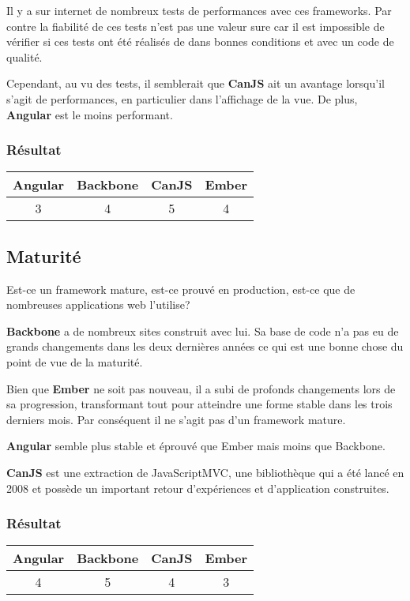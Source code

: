 Il y a sur internet de nombreux tests de performances avec ces frameworks. Par contre la fiabilité de ces tests n'est pas une valeur sure car il est impossible de vérifier si ces tests ont été réalisés de dans bonnes conditions et avec un code de qualité.

Cependant, au vu des tests, il semblerait que \textbf{CanJS} ait un avantage lorsqu'il s’agit de performances, en particulier dans l’affichage de la vue. De plus, \textbf{Angular} est le moins performant.

\subsubsection{Résultat}
\begin{tabular}{|c|c|c|c|}
  \hline 
  Angular & Backbone & CanJS & Ember \\
  \hline 
  3 & 4 & 5 & 4 \\
  \hline
\end{tabular}


\subsection{Maturité}

Est-ce un framework mature, est-ce prouvé en production, est-ce que de nombreuses applications web l’utilise?

\textbf{Backbone} a de nombreux sites construit avec lui. Sa base de code n’a pas eu de grands changements dans les deux dernières années ce qui est une bonne chose du point de vue de la maturité.

Bien que \textbf{Ember} ne soit pas nouveau, il a subi de profonds changements lors de sa progression, transformant tout pour atteindre une forme stable dans les trois derniers mois. Par conséquent il ne s’agit pas d’un framework mature.

\textbf{Angular} semble plus stable et éprouvé que Ember mais moins que Backbone.

\textbf{CanJS} est une extraction de JavaScriptMVC, une bibliothèque qui a été lancé en 2008 et possède un important retour d’expériences et d’application construites.


\subsubsection{Résultat}
\begin{tabular}{|c|c|c|c|}
  \hline 
  Angular & Backbone & CanJS & Ember \\
  \hline 
  4 & 5 & 4 & 3 \\
  \hline
\end{tabular}



